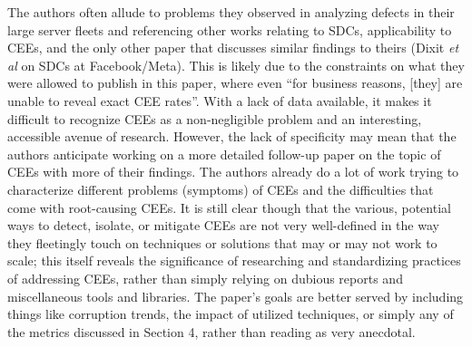 \documentclass [12pt]{article}
\begin{document}
    The authors often allude to problems they observed in analyzing defects in their large server fleets and referencing other works relating to SDCs, applicability to CEEs, and the only other paper that discusses similar findings to theirs (Dixit \emph{et al} on SDCs at Facebook/Meta). This is likely due to the constraints on what they were allowed to publish in this paper, where even ``for business reasons, [they] are unable to reveal exact CEE rates''. With a lack of data available, it makes it difficult to recognize CEEs as a non-negligible problem and an interesting, accessible avenue of research. However, the lack of specificity may mean that the authors anticipate working on a more detailed follow-up paper on the topic of CEEs with more of their findings. The authors already do a lot of work trying to characterize different problems (symptoms) of CEEs and the difficulties that come with root-causing CEEs. It is still clear though that the various, potential ways to detect, isolate, or mitigate CEEs are not very well-defined in the way they fleetingly touch on techniques or solutions that may or may not work to scale; this itself reveals the significance of researching and standardizing practices of addressing CEEs, rather than simply relying on dubious reports and miscellaneous tools and libraries. The paper's goals are better served by including things like corruption trends, the impact of utilized techniques, or simply any of the metrics discussed in Section 4, rather than reading as very anecdotal.
    
    
    
    
    
    
    
 
        
\end{document}
